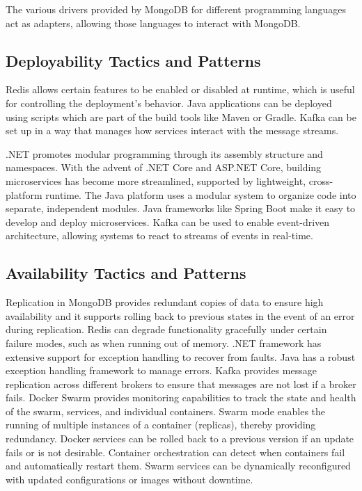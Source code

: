 \documentclass[conference]{IEEEtran}
\begin{document}
The various drivers provided by MongoDB for different programming languages act as adapters, allowing those languages to interact with MongoDB.

\subsection*{Deployability Tactics and Patterns}
Redis allows certain features to be enabled or disabled at runtime, which is useful for controlling the deployment's behavior.
Java applications can be deployed using scripts which are part of the build tools like Maven or Gradle.
Kafka can be set up in a way that manages how services interact with the message streams.

.NET promotes modular programming through its assembly structure and namespaces.
With the advent of .NET Core and ASP.NET Core, building microservices has become more streamlined, supported by lightweight, cross-platform runtime.
The Java platform uses a modular system to organize code into separate, independent modules.
Java frameworks like Spring Boot make it easy to develop and deploy microservices.
Kafka can be used to enable event-driven architecture, allowing systems to react to streams of events in real-time.

\subsection*{Availability Tactics and Patterns}
Replication in MongoDB provides redundant copies of data to ensure high availability and it supports rolling back to previous states in the event of an error during replication.
Redis can degrade functionality gracefully under certain failure modes, such as when running out of memory.
.NET framework has extensive support for exception handling to recover from faults.
Java has a robust exception handling framework to manage errors.
Kafka provides message replication across different brokers to ensure that messages are not lost if a broker fails.
Docker Swarm provides monitoring capabilities to track the state and health of the swarm, services, and individual containers.
Swarm mode enables the running of multiple instances of a container (replicas), thereby providing redundancy.
Docker services can be rolled back to a previous version if an update fails or is not desirable.
Container orchestration can detect when containers fail and automatically restart them.
Swarm services can be dynamically reconfigured with updated configurations or images without downtime.
\end{document}
